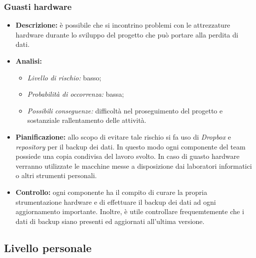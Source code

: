 		\subsubsection{Guasti hardware}
			\begin{itemize}
				\item \textbf{Descrizione:} è possibile che si incontrino problemi con le attrezzature hardware durante lo sviluppo del progetto che può portare alla perdita di dati.
				\item \textbf{Analisi:}
				\begin{itemize}
					\item \textit{Livello di rischio:} basso;
					\item \textit{Probabilità di occorrenza:} bassa;
					\item \textit{Possibili conseguenze:} difficoltà nel proseguimento del progetto e sostanziale rallentamento delle attività.
				\end{itemize}
				\item \textbf{Pianificazione:} allo scopo di evitare tale rischio si fa uso di \textit{Dropbox} e \textit{repository} per il backup dei dati. In questo modo ogni componente del team possiede una copia condivisa del lavoro svolto. In caso di guasto hardware verranno utilizzate le macchine messe a disposizione dai laboratori informatici o altri strumenti personali.
				\item \textbf{Controllo:} ogni componente ha il compito di curare la propria strumentazione hardware e di effettuare il backup dei dati ad ogni aggiornamento importante. Inoltre, è utile controllare frequemtemente che i dati di backup siano presenti ed aggiornati all'ultima versione.
			\end{itemize}
	\subsection{Livello personale}
